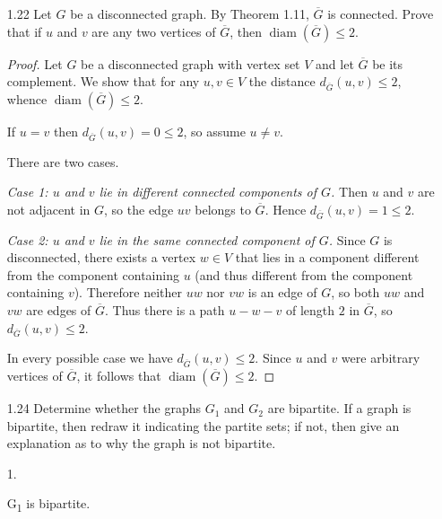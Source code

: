 \documentclass[12pt]{article}
\begin{document}
\begin{enumerate}
\item[1.22] Let $G$ be a disconnected graph. By Theorem 1.11, $\overline{G}$ is connected. 
    Prove that if $u$ and $v$ are any two vertices of $\overline{G}$, then $\operatorname{diam}(\overline{G}) \leq 2$.
\begin{proof}
Let $G$ be a disconnected graph with vertex set $V$ and let $\overline{G}$ be its complement.
We show that for any $u,v\in V$ the distance $d_{\overline{G}}(u,v)\le 2$, whence $\operatorname{diam}(\overline{G})\le 2$.

If $u=v$ then $d_{\overline{G}}(u,v)=0\le2$, so assume $u\neq v$.

There are two cases.

\emph{Case 1: $u$ and $v$ lie in different connected components of $G$.}  
Then $u$ and $v$ are not adjacent in $G$, so the edge $uv$ belongs to $\overline{G}$. Hence
$d_{\overline{G}}(u,v)=1\le2$.

\emph{Case 2: $u$ and $v$ lie in the same connected component of $G$.}  
Since $G$ is disconnected, there exists a vertex $w\in V$ that lies in a component different from the component containing $u$ (and thus different from the component containing $v$). Therefore neither $uw$ nor $vw$ is an edge of $G$, so both $uw$ and $vw$ are edges of $\overline{G}$. Thus there is a path $u-w-v$ of length $2$ in $\overline{G}$, so $d_{\overline{G}}(u,v)\le 2$.

In every possible case we have $d_{\overline{G}}(u,v)\le 2$. Since $u$ and $v$ were arbitrary vertices of $\overline{G}$, it follows that $\operatorname{diam}(\overline{G})\le 2$.
\end{proof}

    
\item[1.24] Determine whether the graphs $G_1$ and $G_2$ are bipartite. If a graph is bipartite, then redraw it indicating the 
    partite sets; if not, then give an explanation as to why the graph is not bipartite.
\item[1. ]
    \begin{center}
    G\textsubscript{1} is bipartite.  
\end{center}
\end{enumerate}
\end{document}
